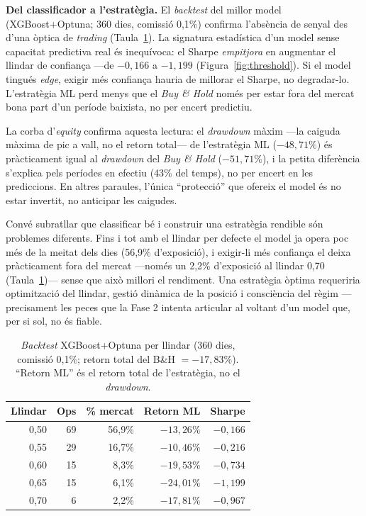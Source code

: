 \documentclass[10pt,twocolumn,a4paper]{article}
\begin{document}
\textbf{Del classificador a l'estratègia.} El \textit{backtest} del millor model
(XGBoost+Optuna; 360 dies, comissió 0,1\%) confirma l'absència de senyal des d'una
òptica de \textit{trading} (Taula~\ref{tab:backtest}). La signatura estadística
d'un model sense capacitat predictiva real és inequívoca: el Sharpe \emph{empitjora}
en augmentar el llindar de confiança ---de $-0{,}166$ a $-1{,}199$
(Figura~\ref{fig:threshold}). Si el model tingués \textit{edge}, exigir més
confiança hauria de millorar el Sharpe, no degradar-lo. L'estratègia ML perd menys
que el \textit{Buy \& Hold} només per estar fora del mercat bona part d'un període
baixista, no per encert predictiu.

La corba d'\textit{equity} confirma aquesta lectura: el \textit{drawdown} màxim
---la caiguda màxima de pic a vall, no el retorn total--- de l'estratègia ML
($-48{,}71\%$) és pràcticament igual al \textit{drawdown} del \textit{Buy \& Hold}
($-51{,}71\%$), i la petita diferència s'explica pels períodes en efectiu (43\% del
temps), no per encert en les prediccions. En altres paraules, l'única ``protecció''
que ofereix el model és no estar invertit, no anticipar les caigudes.

Convé subratllar que classificar bé i construir una estratègia rendible són
problemes diferents. Fins i tot amb el llindar per defecte el model ja opera poc més
de la meitat dels dies (56,9\% d'exposició), i exigir-li més confiança el deixa
pràcticament fora del mercat ---només un 2,2\% d'exposició al llindar 0,70
(Taula~\ref{tab:backtest})--- sense que això millori el rendiment. Una estratègia
òptima requeriria optimització del llindar, gestió dinàmica de la posició i
consciència del règim ---precisament les peces que la Fase 2 intenta articular al
voltant d'un model que, per si sol, no és fiable.

\begin{table}[t]
\centering
\caption{\textit{Backtest} XGBoost+Optuna per llindar (360 dies, comissió 0,1\%; retorn total del B\&H $=-17{,}83\%$). ``Retorn ML'' és el retorn total de l'estratègia, no el \textit{drawdown}.}
\label{tab:backtest}
\small
\setlength{\tabcolsep}{4pt}
\begin{tabular}{@{}rrrrr@{}}
\toprule
\textbf{Llindar} & \textbf{Ops} & \textbf{\% mercat} & \textbf{Retorn ML} & \textbf{Sharpe} \\
\midrule
0,50 & 69 & 56,9\% & $-13{,}26\%$ & $-0{,}166$ \\
0,55 & 29 & 16,7\% & $-10{,}46\%$ & $-0{,}216$ \\
0,60 & 15 &  8,3\% & $-19{,}53\%$ & $-0{,}734$ \\
0,65 & 15 &  6,1\% & $-24{,}01\%$ & $-1{,}199$ \\
0,70 &  6 &  2,2\% & $-17{,}81\%$ & $-0{,}967$ \\
\bottomrule
\end{tabular}
\end{table}
\end{document}
